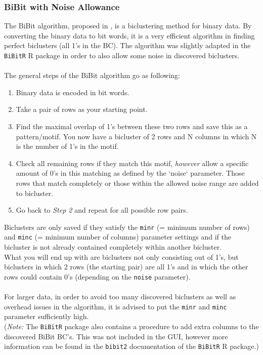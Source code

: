 \documentclass[a4paper]{article}\usepackage[]{graphicx}\usepackage[]{color}
\begin{document}
\subsubsection{BiBit with Noise Allowance}

The BiBit algorithm, proposed in \citet{Rodriguez-Baena2011}, is a biclustering method for binary data. By converting the binary data to bit words, it is a very efficient algorithm in finding perfect biclusters (all 1's in the BC). The algorithm was slightly adapted in the \texttt{BiBitR} R package in order to also allow some noise in discovered biclusters.
\\ \\
The general steps of the BiBit algorithm go as following:
\begin{enumerate}
\item Binary data is encoded in bit words.
\item Take a pair of rows as your starting point.
\item Find the maximal overlap of 1's between these two rows and save this as a pattern/motif. You now have a bicluster of 2 rows and N columns in which N is the number of 1's in the motif.
\item Check all remaining rows if they match this motif, {\it however} allow a specific amount of 0's in this matching as defined by the `noise` parameter. Those rows that match completely or those within the allowed noise range are added to bicluster.
\item Go back to {\it Step 2} and repeat for all possible row pairs.
\end{enumerate}

\noindent Biclusters are only saved if they satisfy the \texttt{minr} (= minimum number of rows) and \texttt{minc} (= minimum number of columns) parameter settings and if the bicluster is not already contained completely within another bicluster.\\
What you will end up with are biclusters not only consisting out of 1's, but biclusters in which 2 rows (the starting pair) are all 1's and in which the other rows could contain 0's (depending on the \texttt{noise} parameter).
\\ \\
For larger data, in order to avoid too many discovered biclusters as well as overhead issues in the algorithm, it is advised to put the \texttt{minr} and \texttt{minc} parameter sufficiently high.\\
({\it Note:} The \texttt{BiBitR} package also contains a procedure to add extra columns to the discovered BiBit BC's. This was not included in the GUI, however more information can be found in the \texttt{bibit2} documentation of the \texttt{BiBitR} R package.)
\end{document}
